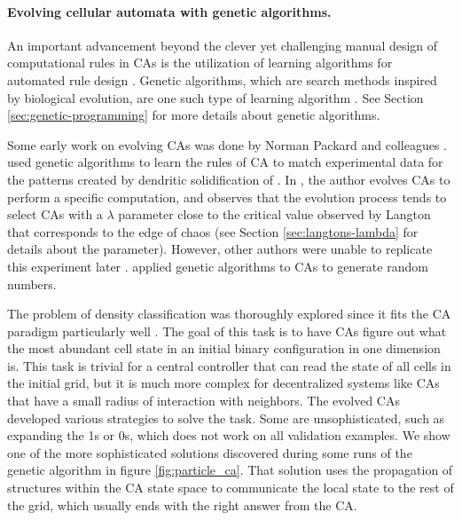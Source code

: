 \paragraph{Evolving cellular automata with genetic algorithms.}
An important advancement beyond the clever yet challenging manual design of 
computational rules in \acp{CA} is the utilization of learning algorithms 
for automated rule design \parencite{mitchellEvolvingCellularAutomata1996}. 
Genetic algorithms, which are search methods inspired 
by biological evolution, are one such type of
learning algorithm \parencite{bookerClassifierSystemsGenetic1989}. See Section
\ref{sec:genetic-programming} for more details about genetic algorithms.

Some early work on evolving \acp{CA} was done by Norman Packard and colleagues
\parencite{packardAdaptationEdgeChaos1988,
  richardsExtractingCellularAutomaton1990}.
\textcite{richardsExtractingCellularAutomaton1990} used genetic algorithms to
learn the rules of \ac{CA} to match experimental data for the patterns created
by dendritic solidification of . In
\parencite{packardAdaptationEdgeChaos1988}, the author evolves \acp{CA} to
perform a specific computation, and observes that the evolution process tends to
select \acp{CA} with a $\lambda$ parameter close to the critical value observed by
Langton that corresponds to the edge of chaos (see Section
\ref{sec:langtons-lambda} for details about the parameter). However, other
authors were unable to replicate this experiment later
\parencite{mitchellRevisitingEdgeChaos1993}.
\textcite{kozaEvolutionSubsumptionUsing1992} applied genetic algorithms to
\acp{CA} to generate random numbers.

The problem of density classification was thoroughly explored since it fits the
\ac{CA} paradigm particularly well \parencite{mitchellRevisitingEdgeChaos1993,
  mitchellEvolvingCellularAutomata1994,
  crutchfieldEvolutionEmergentComputation1995, dasGeneticAlgorithmDiscovers1994,
  sipperCoevolvingNonuniformCellular1996, andreDiscoveryGeneticProgramming1996}.
The goal of this task is to have \acp{CA} figure out what the most abundant cell
state in an initial binary configuration in one dimension is. This task is trivial
for a central controller that can read the state of all cells in the initial
grid, but it is much more complex for decentralized systems like \acp{CA}
that have a small radius of interaction with neighbors. The evolved \acp{CA}
developed various strategies to solve the task. Some are unsophisticated, such
as expanding the 1s or 0s, which does not work on all validation examples. We
show one of the more sophisticated solutions discovered during some runs of the
genetic algorithm in figure \ref{fig:particle_ca}. That solution uses the
propagation of structures within the \ac{CA} state space to communicate the
local state to the rest of the grid, which usually ends with the right answer
from the \ac{CA}.

